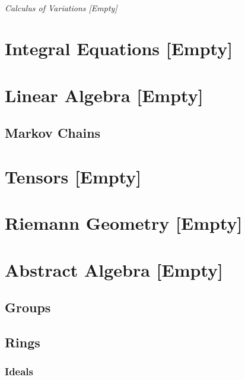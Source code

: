 \documentclass[12pt, english]{book}
\begin{document}
	\paragraph{Calculus of Variations [Empty]} \label{Calculus of Variations Part}
	
	\part{Integral Equations [Empty]} \label{Integral Equations Part}
	
	
	\part{Linear Algebra [Empty]} \label{Linear Algebra Part}
	
	\chapter{Markov Chains} \label{Markov Chains Chapter - Linear Algebra}
	
	
	\part{Tensors [Empty]} \label{Tensors Part}
	
	
	\part{Riemann Geometry [Empty]} \label{Reimann Geometry Part}
	
	
	\part{Abstract Algebra [Empty]} \label{Abstract Algebra Part}
	
	\chapter{Groups} \label{Groups Chapter - Abstract Algebra}
	
	
	\chapter{Rings} \label{Rings Chapter - Abstract Algebra}
	
	\section{Ideals} \label{Ideals Section - Abstract Algebra}
	
\end{document}
